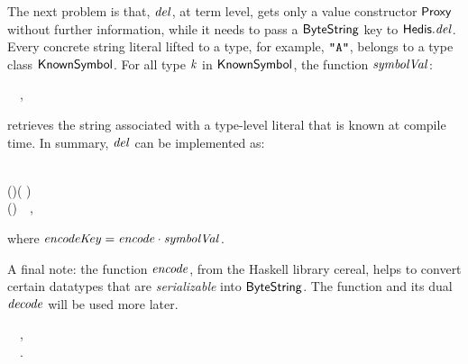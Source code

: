 The next problem is that, \ensuremath{\Varid{del}}, at term level, gets only a value constructor
\ensuremath{\Conid{Proxy}} without further information, while it needs to pass a \ensuremath{\Conid{ByteString}} key
to \ensuremath{\Varid{\Conid{Hedis}.del}}. Every concrete string literal lifted to a type, for example,
\ensuremath{\text{\tt \char34 A\char34}}, belongs to a type class \ensuremath{\Conid{KnownSymbol}}. For all type \ensuremath{\Varid{k}} in \ensuremath{\Conid{KnownSymbol}},
the function \ensuremath{\Varid{symbolVal}}:\begin{hscode}\SaveRestoreHook
{}%
%
%
\>[3]{}\mathbin{::}\;\Rightarrow {}\;\to {}~~,{}\<[E]%
\ColumnHook
\end{hscode}\resethooks
retrieves the string associated with a type-level literal that is known at
compile time. In summary, \ensuremath{\Varid{del}} can be implemented as:
\begin{hscode}\SaveRestoreHook
{}%
%
%
%
\>[B]{}\<[6]%
\>[6]{}\mathbin{::}\;\<[E]%
\\
\>[6]{}\Rightarrow {}\;\to {}\;\;(\;\;)\;( \uplus {}){}\<[E]%
\\
\>[B]{}\;\mathrel{=}\;(){}\<[45]%
\>[45]{}~~,{}\<[E]%
\ColumnHook
\end{hscode}\resethooks
where \ensuremath{\Varid{encodeKey}\mathrel{=}\Varid{encode}\mathbin{\cdot}\Varid{symbolVal}}.

A final note: the function \ensuremath{\Varid{encode}}, from the Haskell library {\sc cereal},
helps to convert certain datatypes that are {\em serializable} into \ensuremath{\Conid{ByteString}}.
The function and its dual \ensuremath{\Varid{decode}} will be used more later.
\begin{hscode}\SaveRestoreHook
{}%
%
%
\>[B]{}\<[9]%
\>[9]{}\mathbin{::}\;\Rightarrow {}\to {}~~,{}\<[E]%
\\
\>[B]{}\<[9]%
\>[9]{}\mathbin{::}\;\Rightarrow {}\to {}\;\;~~.{}\<[E]%
\ColumnHook
\end{hscode}\resethooks


